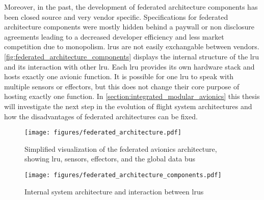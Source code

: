 \documentclass[titlepage]{report}
\begin{document}
Moreover, in the past, the development of federated architecture components has been closed source and very vendor specific. Specifications for
federated architecture components were mostly hidden behind a paywall or non disclosure agreements leading to a decreased developer efficiency
and less market competition due to monopolism. \glspl{lru} are not easily exchangable between vendors. \autoref{fig:federated_architecture_components}
displays the internal structure of the \gls{lru} and its interaction with other \gls{lru}. Each \gls{lru} provides its own hardware stack and hosts
exactly one avionic function. It is possible for one \gls{lru} to speak with multiple sensors or effectors, but this does not change their core
purpose of hosting exactly one function. In \autoref{section:integrated_modular_avionics} this thesis will investigate the next
step in the evolution of flight system architectures and how the disadvantages of federated architectures can be fixed.

\begin{figure}
    \centering
    \texttt{[image: figures/federated\_architecture.pdf]}
    \caption{Simplified visualization of the federated avionics architecture, showing \gls{lru}, sensors, effectors, and the global data bus}\label{fig:federated_architecture}
\end{figure}
\begin{figure}
    \centering
    \texttt{[image: figures/federated\_architecture\_components.pdf]}
    \caption{Internal system architecture and interaction between \glspl{lru}}\label{fig:federated_architecture_components}
\end{figure}
\end{document}
